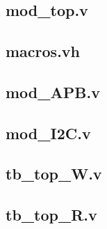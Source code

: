 \appendix
\chapter*{\fuggelek}
\setcounter{chapter}{\appendixnumber}

\section{mod\_top.v}


\section{macros.vh}


\section{mod\_APB.v}
 \label{modapb}

\section{mod\_I2C.v}
 \label{modi2c}

\section{tb\_top\_W.v}
 \label{tbtopW}

\section{tb\_top\_R.v}
 \label{tbtopR}
